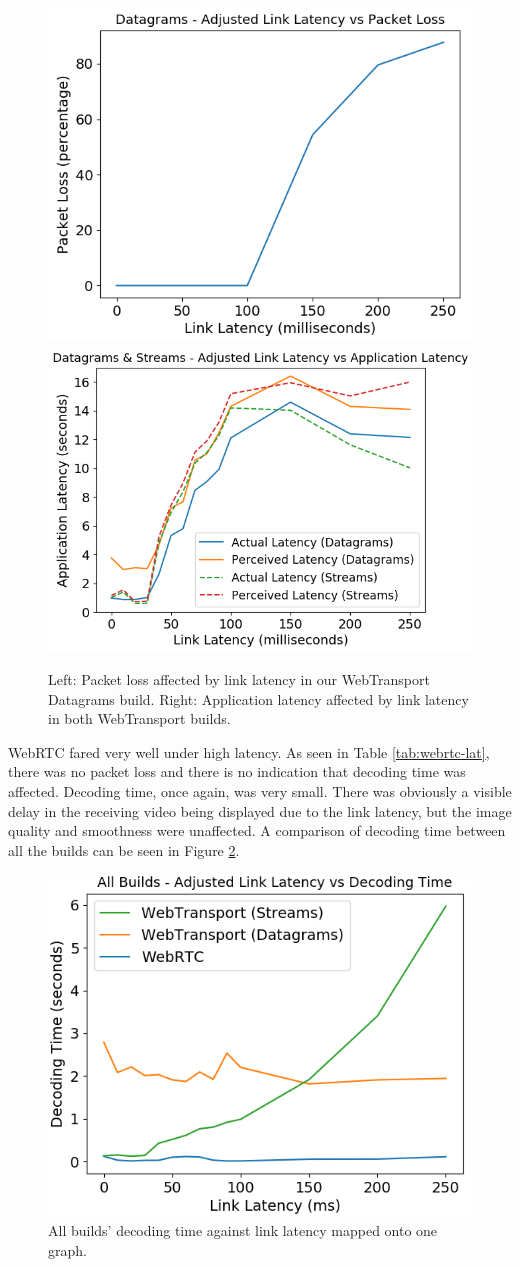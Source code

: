 \begin{figure}[h]
    \centering
    \includegraphics[width=0.475\linewidth]{images/latency/dg-lat-loss.png}
    \includegraphics[width=0.515\linewidth]{images/latency/dg-streams-lat-lat.png}
    \caption{Left: Packet loss affected by link latency in our WebTransport Datagrams build. Right: Application latency affected by link latency in both WebTransport builds.}
    \label{fig:dg-lat-loss-dg-streams-lat-lat} 
\end{figure}

WebRTC fared very well under high latency. As seen in Table \ref{tab:webrtc-lat}, there was no packet loss and there is no indication that decoding time was affected. Decoding time, once again, was very small. There was obviously a visible delay in the receiving video being displayed due to the link latency, but the image quality and smoothness were unaffected. A comparison of decoding time between all the builds can be seen in Figure \ref{fig:all-dec-lat}.

\begin{figure}[h]
    \centering
    \includegraphics[width=0.6\linewidth]{images/latency/all-dec.png}
    \caption{All builds' decoding time against link latency mapped onto one graph.}
    \label{fig:all-dec-lat} 
\end{figure}

